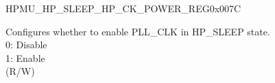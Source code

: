 \begin{register}{H}{PMU\_HP\_SLEEP\_HP\_CK\_POWER\_REG}{0x007C}\label{regdesc:PMUHPSLEEPHPCKPOWERREG}
%
%
%
\regnewline%
\begin{regdesc}\begin{reglist}
\label{fielddesc:PMUHPSLEEPXPDBBPLL}\item [PMU\_HP\_SLEEP\_XPD\_BBPLL] Configures whether to  enable PLL\_CLK in HP\_SLEEP state.\\
0: Disable\\
1: Enable\\
(R/W)
\end{reglist}\end{regdesc}
\end{register}


